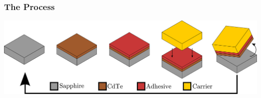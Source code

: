 \documentclass[]{beamer}%
\begin{document}
\begin{frame}
\begin{columns}
\begin{column}{0.5\textwidth}
        \end{column}
    \end{columns}
\end{frame}


\begin{frame}
\frametitle{The Process}
    \begin{center}
    \includegraphics[width=\textwidth,height=0.9\textheight,keepaspectratio]{graphics/cdteliftoff_process}
    \end{center}
\end{frame}
\end{document}
